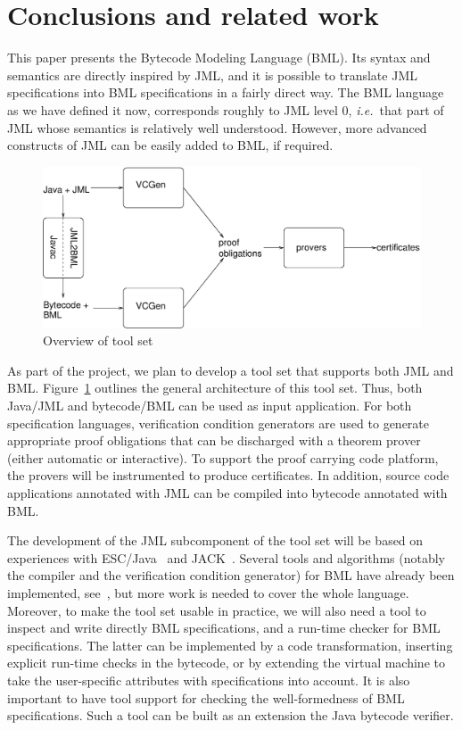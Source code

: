 \section{Conclusions and related work}\label{SecConcl}

This paper presents the Bytecode Modeling Language (BML). Its syntax
and semantics are directly inspired by JML, and it is possible to
translate JML specifications into BML specifications in a fairly
direct way. The BML language as we have defined it now, corresponds
roughly to JML level 0, \emph{i.e.}\ that part of JML whose semantics
is relatively well understood. However, more advanced constructs of
JML can be easily added to BML, if required. 

\begin{figure}[t]
\includegraphics[width=\textwidth]{toolset.eps} 
\caption{Overview of \mobius tool set}\label{FigToolSet}
\end{figure}
As part of the \mobius project, we plan to develop a tool set that
supports both JML and BML. Figure~\ref{FigToolSet} outlines the
general architecture of this tool set. Thus, both Java/JML and
bytecode/BML can be used as input application. For both specification
languages, verification condition generators are used to generate
appropriate proof obligations that can be discharged with a theorem
prover (either automatic or interactive). To support the proof
carrying code platform, the provers will be instrumented to produce
certificates. In addition, source code applications annotated with JML
can be compiled into bytecode annotated with BML.

The development of the JML subcomponent of the tool set will be based
on experiences with ESC/Java~\cite{CokK04} and JACK~\cite{BurdyRL03}.
Several tools and algorithms (notably the compiler and the
verification condition generator) for BML have already been
implemented, see~\cite{BurdyP06}, but more work is needed to cover the
whole language. Moreover, to make the tool set usable in practice, we
will also need a tool to inspect and write directly BML
specifications, and a run-time checker for BML specifications. The
latter can be implemented by a code transformation, inserting explicit
run-time checks in the bytecode, or by extending the virtual machine
to take the user-specific attributes with specifications into account.
It is also important to have tool support for checking the
well-formedness of BML specifications. Such a tool can be built as an
extension the Java bytecode verifier.

